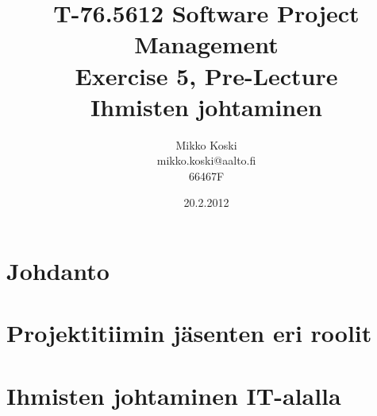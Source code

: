 \documentclass[a4paper]{article}
\begin{document}
\title{\small T-76.5612 Software Project Management \\ Exercise 5, Pre-Lecture \\ \huge Ihmisten johtaminen}
\date{20.2.2012}
\author{Mikko Koski \\ mikko.koski@aalto.fi \\ 66467F}
\maketitle

\normalsize

\section{Johdanto}

\section{Projektitiimin jäsenten eri roolit}





\section{Ihmisten johtaminen IT-alalla}



\citep{grosjean2010}
\citep{appelo2012}
\citep{rsaanimate}
\citep{adkins2010}
\citep{augustine2005}
\citep{mcconnell1996}




\fancyhf{}
 
\rhead{\today}
\rfoot{\thepage}
\end{document}
